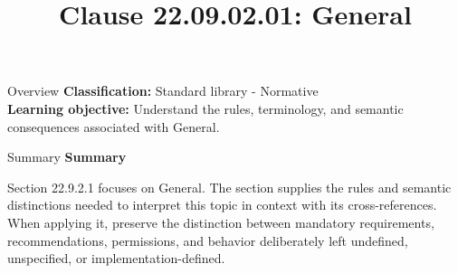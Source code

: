 \documentclass[10pt,letterpaper]{article}
\title{Clause 22.09.02.01: General}
\author{}
\date{}
\begin{document}
\maketitle
\begin{CornellOverviewBox}{Overview}
\textbf{Classification:} Standard library - Normative\\[2pt]
\textbf{Learning objective:} Understand the rules, terminology, and semantic consequences associated with General.
\end{CornellOverviewBox}\begin{CornellSummaryBox}{Summary}
{\sffamily\bfseries\color{Accent} Summary}\par\vspace{3pt}Section 22.9.2.1 focuses on General. The section supplies the rules and semantic distinctions needed to interpret this topic in context with its cross-references. When applying it, preserve the distinction between mandatory requirements, recommendations, permissions, and behavior deliberately left undefined, unspecified, or implementation-defined.
\end{CornellSummaryBox}
\end{document}
